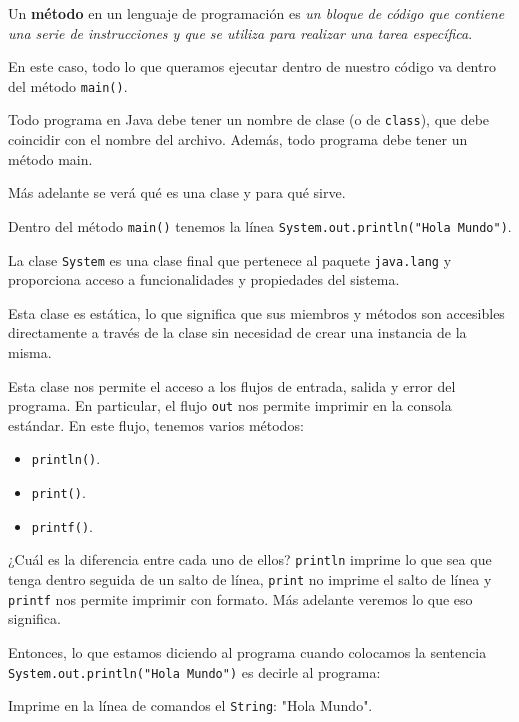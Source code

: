 \documentclass[12pt]{article}
\theoremstyle{largebreak}
\begin{document}
    \begin{mydef}
        Un \textbf{método} en un lenguaje de programación es \textit{un bloque de código que contiene una serie de instrucciones y que se utiliza para realizar una tarea específica}.
    \end{mydef}

    En este caso, todo lo que queramos ejecutar dentro de nuestro código va dentro del método \lstinline|main()|.

    Todo programa en Java debe tener un nombre de clase (o de \lstinline|class|), que debe coincidir con el nombre del archivo. Además, todo programa debe tener un método main.

    \begin{obs}
        Más adelante se verá qué es una clase y para qué sirve.
    \end{obs}

    Dentro del método \lstinline|main()| tenemos la línea \lstinline|System.out.println("Hola Mundo")|.

    \begin{mydef}
        La clase \lstinline|System| es una clase final que pertenece al paquete \lstinline|java.lang| y proporciona acceso a funcionalidades y propiedades del sistema.
    \end{mydef}

    Esta clase es estática, lo que significa que sus miembros y métodos son accesibles directamente a través de la clase sin necesidad de crear una instancia de la misma.
    
    Esta clase nos permite el acceso a los flujos de entrada, salida y error del programa. En particular, el flujo \lstinline|out| nos permite imprimir en la consola estándar. En este flujo, tenemos varios métodos:
    \begin{itemize}
        \item \lstinline|println()|.
        \item \lstinline|print()|.
        \item \lstinline|printf()|.
    \end{itemize}
    ¿Cuál es la diferencia entre cada uno de ellos? \lstinline|println| imprime lo que sea que tenga dentro seguida de un salto de línea, \lstinline|print| no imprime el salto de línea y \lstinline|printf| nos permite imprimir con formato. Más adelante veremos lo que eso significa.
    
    Entonces, lo que estamos diciendo al programa cuando colocamos la sentencia \lstinline|System.out.println("Hola Mundo")| es decirle al programa:
    \begin{center}
        Imprime en la línea de comandos el \lstinline|String|: "Hola Mundo".
    \end{center}
\end{document}
